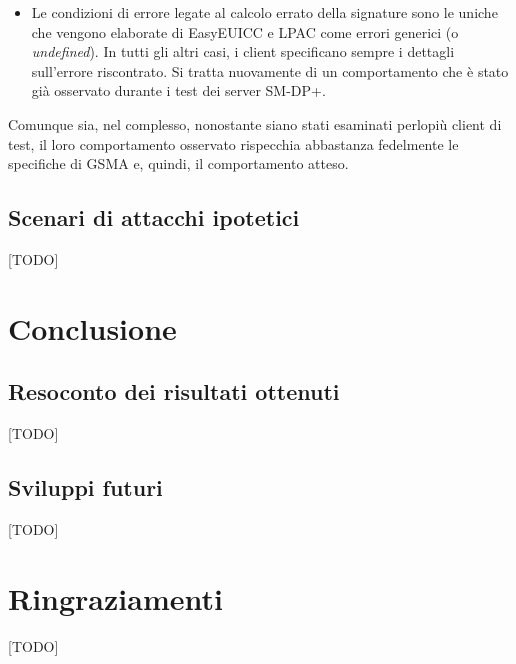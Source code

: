 \documentclass[10pt, oneside]{book}
\begin{document}
\begin{itemize}
\item Le condizioni di errore legate al calcolo errato della signature sono le uniche che vengono elaborate di EasyEUICC e LPAC come errori generici (o \textit{undefined}). In tutti gli altri casi, i client specificano sempre i dettagli sull'errore riscontrato. Si tratta nuovamente di un comportamento che è stato già osservato durante i test dei server SM-DP+.
\end{itemize}
Comunque sia, nel complesso, nonostante siano stati esaminati perlopiù client di test, il loro comportamento osservato rispecchia abbastanza fedelmente le specifiche di GSMA e, quindi, il comportamento atteso.

\section{Scenari di attacchi ipotetici}
[TODO]

\chapter{Conclusione}
\section{Resoconto dei risultati ottenuti}
[TODO]

\section{Sviluppi futuri}
[TODO]



\chapter*{Ringraziamenti}
[TODO]
\end{document}

